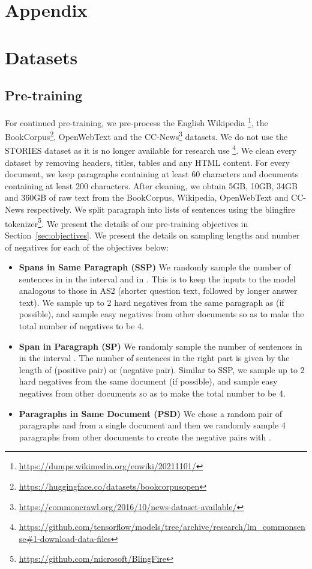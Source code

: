 \clearpage

\section*{Appendix}

\section{Datasets}
\label{app:datasets}

\subsection{Pre-training}
For continued pre-training, we pre-process the English Wikipedia \footnote{\url{https://dumps.wikimedia.org/enwiki/20211101/}}, the BookCorpus\footnote{\url{https://huggingface.co/datasets/bookcorpusopen}}, OpenWebText \citep{Gokaslan2019OpenWeb} and the CC-News\footnote{\url{https://commoncrawl.org/2016/10/news-dataset-available/}} datasets. We do not use the STORIES dataset as it is no longer available for research use \footnote{\url{https://github.com/tensorflow/models/tree/archive/research/lm\_commonsense\#1-download-data-files}}. We clean every dataset by removing headers, titles, tables and any HTML content. For every document, we keep paragraphs containing at least 60 characters and documents containing at least 200 characters. After cleaning, we obtain 5GB, 10GB, 34GB and 360GB of raw text from the BookCorpus, Wikipedia, OpenWebText and CC-News respectively. We split paragraph into lists of sentences using the blingfire tokenizer\footnote{\url{https://github.com/microsoft/BlingFire}}. We present the details of our pre-training objectives in Section~\ref{sec:objectives}. We present the details on sampling lengths and number of negatives for each of the objectives below:

\begin{itemize}[wide, labelindent=0pt]
\itemsep-0.25em
    \item \textbf{Spans in Same Paragraph (SSP)}
    We randomly sample the number of sentences in  in the interval  and  in . This is to keep the inputs to the model analogous to those in AS2 (shorter question text, followed by longer answer text). We sample up to 2 hard negatives from the same paragraph as  (if possible), and sample easy negatives from other documents so as to make the total number of negatives to be 4.
\item \textbf{Span in Paragraph (SP)}
    We randomly sample the number of sentences in  in the interval . The number of sentences in the right part is given by the length of  (positive pair) or  (negative pair). Similar to SSP, we sample up to 2 hard negatives from the same document (if possible), and sample easy negatives from other documents so as to make the total number to be 4.
\item \textbf{Paragraphs in Same Document (PSD)}
    We chose a random pair of paragraphs  and  from a single document and then we randomly sample 4 paragraphs from other documents to create the negative pairs with .
\end{itemize}


